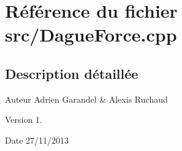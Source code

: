 \section{Référence du fichier src/\-Dague\-Force.cpp}
\label{_dague_force_8cpp}


\subsection{Description détaillée}
\begin{DoxyAuthor}{Auteur}
Adrien Garandel \& Alexis Ruchaud 
\end{DoxyAuthor}
\begin{DoxyVersion}{Version}
1. 
\end{DoxyVersion}
\begin{DoxyDate}{Date}
27/11/2013 
\end{DoxyDate}

